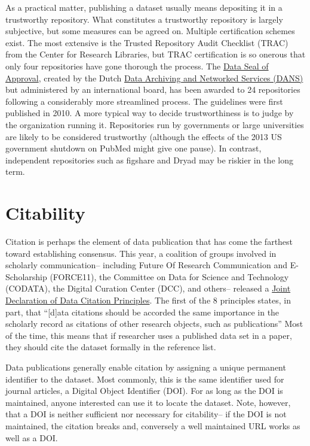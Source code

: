\documentclass[10pt,twocolumn]{article}
\begin{document}
As a practical matter, publishing a dataset usually means depositing it in a trustworthy repository. 
What constitutes a trustworthy repository is largely subjective, but some measures can be agreed on. 
Multiple certification schemes exist.
The most extensive is the Trusted Repository Audit Checklist (TRAC)\cite{dale_trustworthy_2007} from the Center for Research Libraries, but TRAC certification is so onerous that only four repositories have gone thorough the process. 
The \href{http://datasealofapproval.org/}{Data Seal of Approval}, created by the Dutch \href{http://www.dans.knaw.nl/en}{Data Archiving and Networked Services (DANS)} but administered by an international board, has been awarded to 24 repositories following a considerably more streamlined process. 
The guidelines were first published in 2010.
A more typical way to decide trustworthiness is to judge by the organization running it. 
Repositories run by governments or large universities are likely to be considered trustworthy (although the effects of the 2013 US government shutdown on PubMed might give one pause).
In contrast, independent repositories such as figshare and Dryad may be riskier in the long term. %

\section*{Citability}\label{citability}

Citation is perhaps the element of data publication that has come the farthest toward establishing consensus.  
This year, a coalition of groups involved in scholarly communication– including Future Of Research Communication and E-Scholarship (FORCE11)\cite{bourne_improving_2012}, the Committee on Data for Science and Technology (CODATA)\cite{codata-icsti_task_group_on_data_citation_standards_and_practices_out_2013}, the Digital Curation Center (DCC), and others– released a \href{http://www.force11.org/datacitation}{Joint Declaration of Data Citation Principles}.
The first of the 8 principles states, in part, that ``[d]ata citations should be accorded the same importance in the scholarly record as citations of other research objects, such as publications''
Most of the time, this means that if researcher uses a published data set in a paper, they should cite the dataset formally in the reference list. 
	
Data publications generally enable citation by assigning a unique permanent identifier to the dataset.
Most commonly, this is the same identifier used for journal articles, a Digital Object Identifier (DOI).
For as long as the DOI is maintained, anyone interested can use it to locate the dataset. 
Note, however, that a DOI is neither sufficient nor necessary for citability-- if the DOI is not maintained, the citation breaks and, conversely a well maintained URL works as well as a DOI. 
\end{document}
